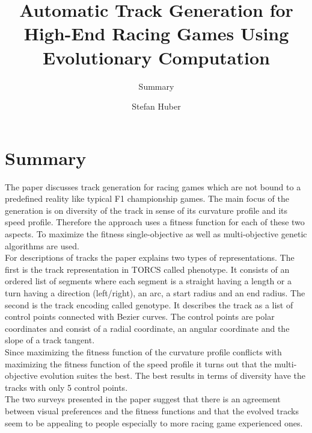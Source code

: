 \documentclass[oneside, notitlepage, twocolumn]{scrartcl}
\title{\LARGE Automatic Track Generation for High-End Racing Games Using Evolutionary Computation}
\subtitle{Summary}
\author{Stefan Huber}
\begin{document}
\maketitle

\section{Summary}
The paper discusses track generation for racing games which are not bound to a predefined reality like typical F1 championship games.
The main focus of the generation is on diversity of the track in sense of its curvature profile and its speed profile.
Therefore the approach uses a fitness function for each of these two aspects.
To maximize the fitness single-objective as well as multi-objective genetic algorithms are used.\\
For descriptions of tracks the paper explains two types of representations.
The first is the track representation in TORCS called phenotype.
It consists of an ordered list of segments where each segment is a straight having a length or a turn having a direction (left/right), an arc, a start radius and an end radius.
The second is the track encoding called genotype.
It describes the track as a list of control points connected with Bezier curves.
The control points are polar coordinates and consist of a radial coordinate, an angular coordinate and the slope of a track tangent.\\
Since maximizing the fitness function of the curvature profile conflicts with maximizing the fitness function of the speed profile it turns out that the multi-objective evolution suites the best.
The best results in terms of diversity have the tracks with only 5 control points.\\
The two surveys presented in the paper suggest that there is an agreement between visual preferences and the fitness functions and that the evolved tracks seem to be appealing to people especially to more racing game experienced ones.
\end{document}

